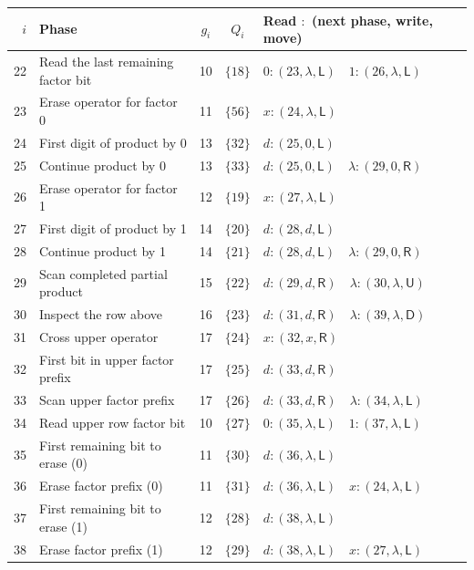 \documentclass[11pt,a4paper]{article}
\newcommand{\blank}{\lambda}
\newcommand{\triple}[3]{(#1,#2,\mathsf{#3})}
\begin{document}
\begin{center}
\fontsize{9.2}{11}\selectfont\renewcommand{\arraystretch}{1.23}
\setlength{\tabcolsep}{4pt}
\begin{tabularx}{\textwidth}{r p{6cm} c c X}
\toprule\rowcolor{Pale}$i$ & Phase & $g_i$ & $Q_i$ & Read $:$ (next phase, write, move)\\\midrule
22 & Read the last remaining factor bit & 10 & $\{18\}$ & $0:\triple{23}{\blank}{L}\quad 1:\triple{26}{\blank}{L}$ \\
23 & Erase operator for factor 0 & 11 & $\{56\}$ & $x:\triple{24}{\blank}{L}$ \\
24 & First digit of product by 0 & 13 & $\{32\}$ & $d:\triple{25}{0}{L}$ \\
25 & Continue product by 0 & 13 & $\{33\}$ & $d:\triple{25}{0}{L}\quad \blank:\triple{29}{0}{R}$ \\
26 & Erase operator for factor 1 & 12 & $\{19\}$ & $x:\triple{27}{\blank}{L}$ \\
27 & First digit of product by 1 & 14 & $\{20\}$ & $d:\triple{28}{d}{L}$ \\
28 & Continue product by 1 & 14 & $\{21\}$ & $d:\triple{28}{d}{L}\quad \blank:\triple{29}{0}{R}$ \\
29 & Scan completed partial product & 15 & $\{22\}$ & $d:\triple{29}{d}{R}\quad \blank:\triple{30}{\blank}{U}$ \\
30 & Inspect the row above & 16 & $\{23\}$ & $d:\triple{31}{d}{R}\quad \blank:\triple{39}{\blank}{D}$ \\
31 & Cross upper operator & 17 & $\{24\}$ & $x:\triple{32}{x}{R}$ \\
32 & First bit in upper factor prefix & 17 & $\{25\}$ & $d:\triple{33}{d}{R}$ \\
33 & Scan upper factor prefix & 17 & $\{26\}$ & $d:\triple{33}{d}{R}\quad \blank:\triple{34}{\blank}{L}$ \\
34 & Read upper row factor bit & 10 & $\{27\}$ & $0:\triple{35}{\blank}{L}\quad 1:\triple{37}{\blank}{L}$ \\
35 & First remaining bit to erase (0) & 11 & $\{30\}$ & $d:\triple{36}{\blank}{L}$ \\
36 & Erase factor prefix (0) & 11 & $\{31\}$ & $d:\triple{36}{\blank}{L}\quad x:\triple{24}{\blank}{L}$ \\
37 & First remaining bit to erase (1) & 12 & $\{28\}$ & $d:\triple{38}{\blank}{L}$ \\
38 & Erase factor prefix (1) & 12 & $\{29\}$ & $d:\triple{38}{\blank}{L}\quad x:\triple{27}{\blank}{L}$ \\
\bottomrule
\end{tabularx}
\end{center}
\end{document}
